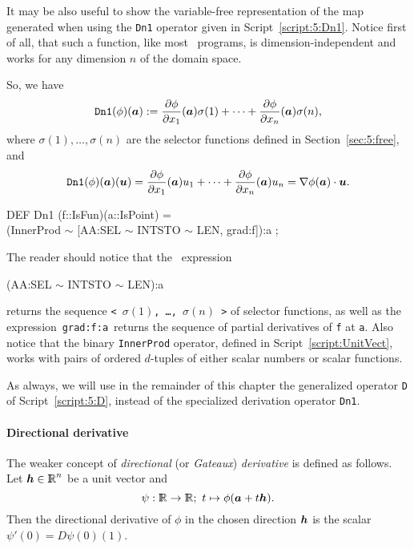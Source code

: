 \documentclass{31x47jw}
\begin{document}
It may be also useful to show the variable-free representation of the
map generated when using the \texttt{Dn1} operator given in
Script~\ref{script:5:Dn1}.  Notice first of all, that such a function,
like most \pl\ programs, is dimension-independent and works for any
dimension $n$ of the domain space.

So, we have
\[
\texttt{Dn1}(\phi)({\mbox{\boldmath $a$}}) := 
 {\partial \phi \over \partial x_{1}}({\mbox{\boldmath $a$}})  \sigma({1}) +
\cdots + {\partial \phi \over \partial x_{n}}({\mbox{\boldmath $a$}}) \sigma({n}) ,
\]
where $\sigma({1}),\ldots,\sigma({n})$ are the selector functions
defined in Section~\ref{sec:5:free}, and 
\[
\texttt{Dn1}(\phi)({\mbox{\boldmath $a$}})({\mbox{\boldmath $u$}}) = 
 {\partial \phi \over \partial x_{1}}({\mbox{\boldmath $a$}}) u_{1} +
\cdots + {\partial \phi \over \partial x_{n}}({\mbox{\boldmath $a$}}) u_{n}  = 
\nabla \phi ({\mbox{\boldmath $a$}}) \cdot {\mbox{\boldmath $u$}}.
\]


\begin{script}
\begin{smallplasm} 
DEF Dn1 (f::IsFun)(a::IsPoint) = \+\\
  (InnerProd  $\sim$  [AA:SEL  $\sim$  INTSTO  
  $\sim$  LEN, grad:f]):a ;
\end{smallplasm} 
\label{script:5:Dn1}
\end{script}

The reader should notice that the \pl\ expression 
\begin{smallplasm}
  (AA:SEL $\sim$ INTSTO $\sim$ LEN):a
\end{smallplasm}
returns the sequence \texttt{< $\sigma({1})$, \ldots, $\sigma({n})$ >}
of selector functions, as well as the expression\ \texttt{grad:f:a}\
returns the sequence of partial derivatives of \texttt{f} at
\texttt{a}.  Also notice that the binary \texttt{InnerProd} operator,
defined in Script~\ref{script:UnitVect}, works with pairs of ordered
$d$-tuples of either scalar numbers or scalar functions.

As always, we will use in the remainder of this chapter the generalized
operator \texttt{D} of Script~\ref{script:5:D}, instead of the
specialized derivation operator \texttt{Dn1}.


\paragraph{Directional derivative}

The weaker concept of \emph{directional} (or \emph{Gateaux})
\emph{derivative} is defined as follows. Let ${\mbox{\boldmath $h$}}\in \mathbb{I\!\!R}^{n}$ be a 
unit vector and 
\[
\psi:\mathbb{I\!\!R}\rightarrow\mathbb{I\!\!R};\ t\mapsto \phi({\mbox{\boldmath $a$}}+t{\mbox{\boldmath $h$}}).
\]
Then the directional derivative of $\phi$ in the chosen direction ${\mbox{\boldmath $h$}}$ is 
the scalar $\psi'(0) = D\psi(0)(1)$.  
\end{document}
